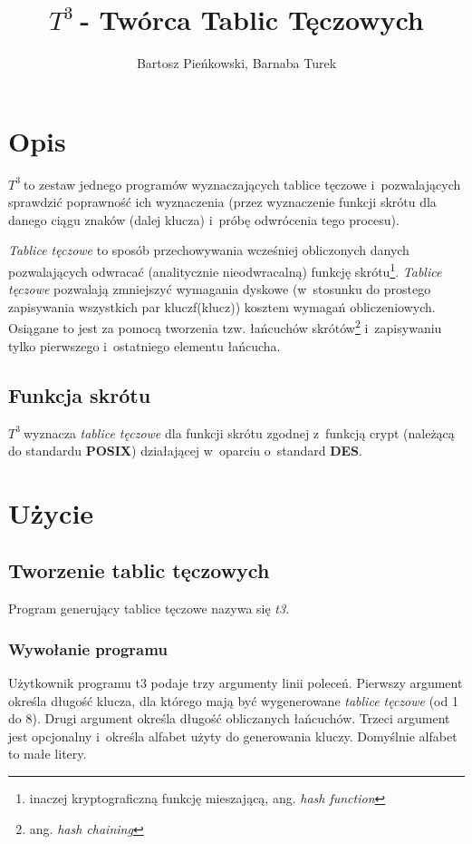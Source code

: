 \documentclass{article}
\begin{document}
\sloppy

\newcommand{\ttt}{$T^3\:$}

\title{\ttt - Twórca Tablic Tęczowych}
\author{Bartosz Pieńkowski, Barnaba Turek}
\maketitle
\section{Opis}
\ttt to zestaw jednego programów wyznaczających tablice tęczowe i~pozwalających sprawdzić poprawność ich wyznaczenia (przez wyznaczenie funkcji skrótu dla danego ciągu znaków (dalej klucza) i~próbę odwrócenia tego procesu).

\emph{Tablice tęczowe} to sposób przechowywania wcześniej obliczonych danych pozwalających odwracać (analitycznie nieodwracalną) funkcję skrótu\footnote{inaczej kryptograficzną funkcję mieszającą, ang. \emph{hash function}}.
\emph{Tablice tęczowe} pozwalają zmniejszyć wymagania dyskowe (w~stosunku do prostego zapisywania wszystkich par klucz\dywiz f(klucz)) kosztem wymagań obliczeniowych.
Osiągane to jest za pomocą tworzenia tzw. łańcuchów skrótów\footnote{ang. \emph{hash chaining}} i~zapisywaniu tylko pierwszego i~ostatniego elementu łańcucha.

\subsection{Funkcja skrótu}
\ttt wyznacza \emph{tablice tęczowe} dla funkcji skrótu zgodnej z~funkcją crypt (należącą do standardu \textbf{POSIX}) działającej w~oparciu o~standard \textbf{DES}.

\section{Użycie}
\subsection{Tworzenie tablic tęczowych}
Program generujący tablice tęczowe nazywa się \emph{t3}.

\subsubsection{Wywołanie programu}
Użytkownik programu t3 podaje trzy argumenty linii poleceń. Pierwszy argument określa długość klucza, dla którego mają być wygenerowane \emph{tablice tęczowe} (od 1 do 8).
Drugi argument określa długość obliczanych łańcuchów.
Trzeci argument jest opcjonalny i~określa alfabet użyty do generowania kluczy. Domyślnie alfabet to małe litery.
\end{document}

